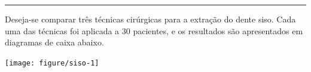 \documentclass[a4paper,11pt,fleqn]{article}\usepackage[]{graphicx}\usepackage[]{color}
\newenvironment{knitrout}{}{} %
\theoremstyle{definition}
\begin{document}
\clearpage

\vspace{0.3cm}
\hrule
\vspace{0.3cm}

\begin{compactenum}[5.] %
\item Deseja-se comparar três técnicas cirúrgicas para a extração do
  dente siso. Cada uma das técnicas foi aplicada a 30 pacientes, e os
  resultados são apresentados em diagramas de caixa abaixo.\vspace{1em}
\begin{knitrout}\small
{}\color{fgcolor}

{\centering \texttt{[image: figure/siso-1]} 

}




\end{knitrout}
\end{compactenum}
\end{document}
